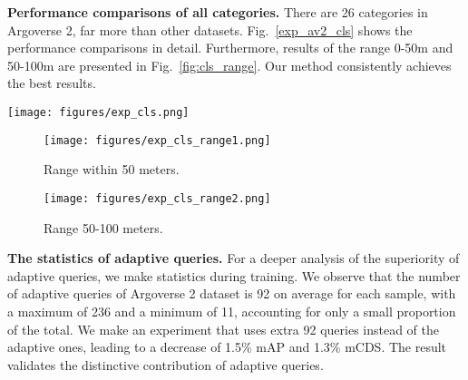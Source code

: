 \documentclass[letterpaper]{article} \usepackage{aaai24}
\begin{document}
\noindent\textbf{Performance comparisons of all categories.} 
There are 26 categories in Argoverse 2, far more than other datasets. Fig.~\ref{exp_av2_cls} shows the performance comparisons in detail. Furthermore, results of the range 0-50m and 50-100m are presented in Fig.~\ref{fig:cls_range}. Our method consistently achieves the best results.

\begin{figure*}[hbt!]
\centering
\texttt{[image: figures/exp\_cls.png]}
\caption{Performance of all categories on Argoverse 2 \texttt{val} set, with adopting VoV-99 backbone. We discard Message Board Trailer due to its near-zero result. }
\label{exp_av2_cls}
\end{figure*}

\begin{figure*}[htb!]
  \centering
  \begin{subfigure}{0.49\textwidth}
    \centering
    \texttt{[image: figures/exp\_cls\_range1.png]}
    \caption{Range within 50 meters.}
\end{subfigure}
  \hfill
  \begin{subfigure}{0.49\textwidth}
    \centering
    \texttt{[image: figures/exp\_cls\_range2.png]}
    \caption{Range 50-100 meters.}
\end{subfigure}
  \caption{Performance of first eight categories in different ranges.}
  \label{fig:cls_range}
\end{figure*}


\noindent\textbf{The statistics of adaptive queries.}
For a deeper analysis of the superiority of adaptive queries, we make statistics during training. We observe that the number of adaptive queries of Argoverse 2 dataset is 92 on average for each sample, with a maximum of 236 and a minimum of 11, accounting for only a small proportion of the total. We make an experiment that uses extra 92 queries instead of the adaptive ones, leading to a decrease of 1.5\% mAP and 1.3\% mCDS. The result validates the distinctive contribution of adaptive queries.
\end{document}

